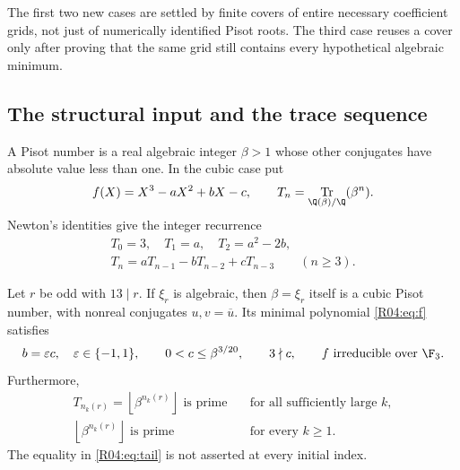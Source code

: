 \documentclass[11pt,a4paper]{article}
\theoremstyle{definition}\newtheorem{definition}[theorem]{Definition}
\theoremstyle{remark}\newtheorem{remark}[theorem]{Remark}
\newcommand{\floor}[1]{\left\lfloor#1\right\rfloor}
\DeclareMathOperator{\Tr}{Tr}\DeclareMathOperator{\tr}{tr}\DeclareMathOperator{\Nm}{N}
\begin{document}
The first two new cases are settled by finite covers of entire necessary
coefficient grids, not just of numerically identified Pisot roots.
The third case reuses a cover only after proving that the same grid
still contains every hypothetical algebraic minimum.

\subsection{The structural input and the trace sequence}
\label{R04:sec:input}

A Pisot number is a real algebraic integer $\beta>1$ whose other
conjugates have absolute value less than one. In the cubic case put
\begin{equation}\label{R04:eq:f}
 f(X)=X^3-aX^2+bX-c,\qquad
 T_n=\Tr_{\Q(\beta)/\Q}(\beta^n).
\end{equation}
Newton's identities give the integer recurrence
\begin{equation}\label{R04:eq:trace}
 \begin{gathered}
 T_0=3,\quad T_1=a,\quad T_2=a^2-2b,\\
 T_n=aT_{n-1}-bT_{n-2}+cT_{n-3}\qquad(n\ge3).
 \end{gathered}
\end{equation}

\begin{proposition}\label{R04:prop:input}
Let $r$ be odd with $13\mid r$. If $\xi_r$ is algebraic, then
$\beta=\xi_r$ itself is a cubic Pisot number, with nonreal conjugates
$u,v=\overline u$. Its minimal polynomial \eqref{R04:eq:f} satisfies
\begin{equation}\label{R04:eq:structural}
 b=\varepsilon c,\quad \varepsilon\in\{-1,1\},\qquad
 0<c\le\beta^{3/20},\qquad 3\nmid c,
 \qquad f\text{ irreducible over }\F_3.
\end{equation}
Furthermore,
\begin{align}
 T_{n_k(r)}=\floor{\beta^{n_k(r)}}\text{ is prime}
 &\quad\text{for all sufficiently large }k,\label{R04:eq:tail}\\
 \floor{\beta^{n_k(r)}}\text{ is prime}
 &\quad\text{for every }k\ge1.\label{R04:eq:floorall}
\end{align}
The equality in \eqref{R04:eq:tail} is not asserted at every initial index.
\end{proposition}
\end{document}
